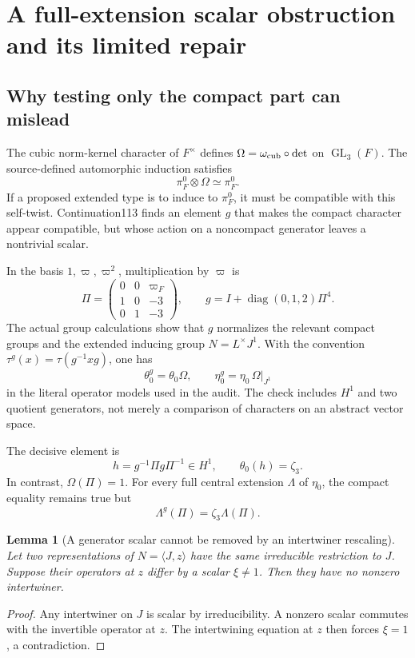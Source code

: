 \documentclass[11pt]{article}
\newtheorem{lemma}[proposition]{Lemma}
\theoremstyle{definition}\newtheorem{definition}[proposition]{Definition}
\newcommand{\GL}{\operatorname{GL}}
\begin{document}
\section{A full-extension scalar obstruction and its limited repair}\label{sec:scalar}
\subsection{Why testing only the compact part can mislead}
The cubic norm-kernel character of $F^\times$ defines $\Omega=\omega_{\rm cub}\circ\det$ on $\GL_3(F)$. The source-defined automorphic induction satisfies
\[
 \pi_F^0\otimes\Omega\simeq\pi_F^0.
\]
If a proposed extended type is to induce to $\pi_F^0$, it must be compatible with this self-twist. Continuation113 finds an element $g$ that makes the compact character appear compatible, but whose action on a noncompact generator leaves a nontrivial scalar.

In the basis $1,\varpi,\varpi^2$, multiplication by $\varpi$ is
\[
 \Pi=\begin{pmatrix}0&0&\varpi_F\\1&0&-3\\0&1&-3\end{pmatrix},
 \qquad
 g=I+\operatorname{diag}(0,1,2)\Pi^4.
 \tag{18.1}\label{eq:Pi}
\]
The actual group calculations show that $g$ normalizes the relevant compact groups and the extended inducing group $N=L^\times J^1$. With the convention $\tau^g(x)=\tau(g^{-1}xg)$, one has
\[
 \theta_0^g=\theta_0\Omega,\qquad
 \eta_0^g=\eta_0\,\Omega|_{J^1}
\]
in the literal operator models used in the audit. The check includes $H^1$ and two quotient generators, not merely a comparison of characters on an abstract vector space.

The decisive element is
\[
 h=g^{-1}\Pi g\Pi^{-1}\in H^1,
 \qquad \theta_0(h)=\zeta_3.
 \tag{18.2}\label{eq:scalar}
\]
In contrast, $\Omega(\Pi)=1$. For every full central extension $\Lambda$ of $\eta_0$, the compact equality remains true but
\[
 \Lambda^g(\Pi)=\zeta_3\Lambda(\Pi).
\]

\begin{lemma}[A generator scalar cannot be removed by an intertwiner rescaling]\label{lem:scalar}
Let two representations of $N=\langle J,z\rangle$ have the same irreducible restriction to $J$. Suppose their operators at $z$ differ by a scalar $\xi\neq1$. Then they have no nonzero intertwiner.
\end{lemma}
\begin{proof}
Any intertwiner on $J$ is scalar by irreducibility. A nonzero scalar commutes with the invertible operator at $z$. The intertwining equation at $z$ then forces $\xi=1$, a contradiction.
\end{proof}
\end{document}
